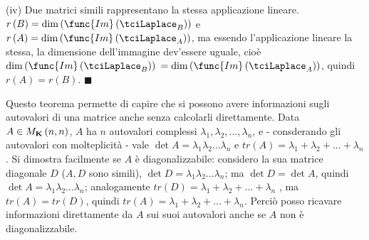 \documentclass{article}
\begin{document}
(iv) Due matrici simili rappresentano la stessa applicazione lineare. $%
r\left( B\right) =\dim \left( \func{Im}\left( \tciLaplace _{B}\right)
\right) $ e $r\left( A\right) =\dim \left( \func{Im}\left( \tciLaplace
_{A}\right) \right) $, ma essendo l'applicazione lineare la stessa, la
dimensione dell'immagine dev'essere uguale, cio\`{e} $\dim \left( \func{Im}%
\left( \tciLaplace _{B}\right) \right) $ $=\dim \left( \func{Im}\left(
\tciLaplace _{A}\right) \right) $, quindi $r\left( A\right) =r\left(
B\right) $. $\blacksquare $

Questo teorema permette di capire che si possono avere informazioni sugli
autovalori di una matrice anche senza calcolarli direttamente. Data $A\in M_{%
\mathbf{K}}\left( n,n\right) $, $A$ ha $n$ autovalori complessi $\lambda
_{1},\lambda _{2},...,\lambda _{n}$, e - consderando gli autovalori con
molteplicit\`{a} - vale $\det A=\lambda _{1}\lambda _{2}...\lambda _{n}$ e $%
tr\left( A\right) =\lambda _{1}+\lambda _{2}+...+\lambda _{n}$. Si dimostra
facilmente se $A$ \`{e} diagonalizzabile: considero la sua matrice diagonale 
$D$ ($A,D$ sono simili), $\det D=\lambda _{1}\lambda _{2}...\lambda _{n}$;
ma $\det D=\det A$, quindi $\det A=\lambda _{1}\lambda _{2}...\lambda _{n}$;
analogamente $tr\left( D\right) =\lambda _{1}+\lambda _{2}+...+\lambda _{n}$%
, ma $tr\left( A\right) =tr\left( D\right) $, quindi $tr\left( A\right)
=\lambda _{1}+\lambda _{2}+...+\lambda _{n}$. Perci\`{o} posso ricavare
informazioni direttamente da $A$ sui suoi autovalori anche se $A$ non \`{e}
diagonalizzabile.
\end{document}
